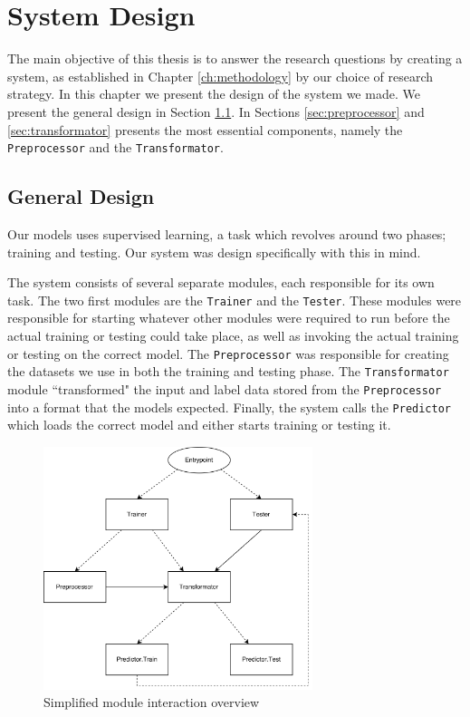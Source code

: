 
\chapter{System Design}
\label{ch:system_design}
The main objective of this thesis is to answer the research questions by creating a system, as established in Chapter \ref{ch:methodology} by our choice of research strategy. In this chapter we present the design of the system we made. We present the general design in Section \ref{sec:general_design}. In Sections \ref{sec:preprocessor} and \ref{sec:transformator} presents the most essential components, namely the {\tt Preprocessor} and the {\tt Transformator}.


\section{General Design}
\label{sec:general_design}
Our models uses supervised learning, a task which revolves around two phases; training and testing. Our system was design specifically with this in mind.

The system consists of several separate modules, each responsible for its own task. The two first modules are the {\tt Trainer} and the {\tt Tester}. These modules were responsible for starting whatever other modules were required to run before the actual training or testing could take place, as well as invoking the actual training or testing on the correct model. The {\tt Preprocessor} was responsible for creating the datasets we use in both the training and testing phase. The {\tt Transformator} module ``transformed" the input and label data stored from the {\tt Preprocessor} into a format that the models expected. Finally, the system calls the {\tt Predictor} which loads the correct model and either starts training or testing it.

\begin{figure}[ht]
    \centering
    \includegraphics[width=0.7\textwidth]{fig/system_design/system_design.png}
    \caption{Simplified module interaction overview}
    \label{fig:system-design}
\end{figure}

